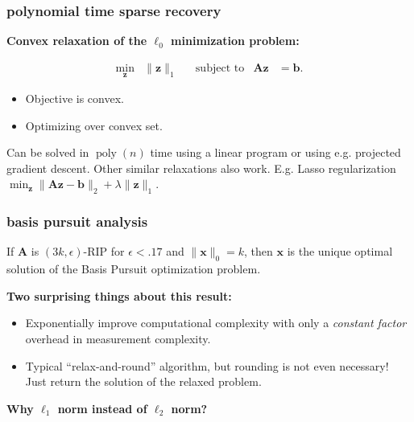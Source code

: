\documentclass[compress]{beamer}
\newcommand{\bv}[1]{\mathbf{#1}}
\DeclareMathOperator{\poly}{poly}
\begin{document}
	\begin{frame}[t]
		\frametitle{polynomial time sparse recovery}
		\textbf{Convex relaxation of the $\ell_0$ minimization problem:}
		\begin{problem}
			\begin{align*}
				\min_{\bv{z}} &\|\bv{z}\|_1 & &\text{subject to} & \bv{Az} &= \bv{b} .
			\end{align*}
		\end{problem}
		\begin{itemize}
			\item Objective is convex. \vspace{2em}
			
			\item Optimizing over convex set. 
		\end{itemize}
	Can be solved in $\poly(n)$ time using a linear program or using e.g. projected gradient descent. Other similar relaxations also work. E.g. Lasso regularization $\min_\bv{z} \|\bv{A}\bv{z} - \bv{b}\|_2 + \lambda \|\bv{z}\|_1$. 
	\end{frame}


	\begin{frame}[t]
	\frametitle{basis pursuit analysis}
	\begin{theorem}
		If $\bv{A}$ is $(3k, \epsilon)$-RIP for $\epsilon < .17$ and $\|\bv{x}\|_0 = k$, then $\bv{x}$ is the unique optimal solution of the Basis Pursuit optimization problem.
	\end{theorem}
	\textbf{Two surprising things about this result:}
	\begin{itemize}
		\item Exponentially improve computational complexity with only a \emph{constant factor} overhead in measurement complexity.
		\item Typical ``relax-and-round'' algorithm, but rounding is not even necessary! Just return the solution of the relaxed problem. 
	\end{itemize}
\begin{center}
	\textbf{\alert{Why $\ell_1$ norm instead of $\ell_2$ norm?}}
\end{center}
\end{frame}
	
\end{document}
